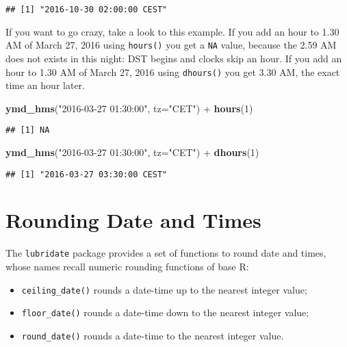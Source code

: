 \documentclass[]{book}
\newenvironment{Shaded}{\begin{snugshade}}{\end{snugshade}}
\newcommand{\KeywordTok}[1]{\textcolor[rgb]{0.13,0.29,0.53}{\textbf{{#1}}}}
\newcommand{\DataTypeTok}[1]{\textcolor[rgb]{0.13,0.29,0.53}{{#1}}}
\newcommand{\DecValTok}[1]{\textcolor[rgb]{0.00,0.00,0.81}{{#1}}}
\newcommand{\StringTok}[1]{\textcolor[rgb]{0.31,0.60,0.02}{{#1}}}
\newcommand{\NormalTok}[1]{{#1}}
\providecommand{\tightlist}{%
  \setlength{\itemsep}{0pt}\setlength{\parskip}{0pt}}
\def\tightlist{}
\begin{document}
\begin{verbatim}
## [1] "2016-10-30 02:00:00 CEST"
\end{verbatim}

If you want to go crazy, take a look to this example. If you add an hour
to 1.30 AM of March 27, 2016 using \texttt{hours()} you get a
\texttt{NA} value, because the 2.59 AM does not exists in this night:
DST begins and clocks skip an hour. If you add an hour to 1.30 AM of
March 27, 2016 using \texttt{dhours()} you get 3.30 AM, the exact time
an hour later.

\begin{Shaded}
\begin{Highlighting}[]
\KeywordTok{ymd_hms}\NormalTok{(}\StringTok{"2016-03-27 01:30:00"}\NormalTok{, }\DataTypeTok{tz=}\StringTok{"CET"}\NormalTok{) +}\StringTok{ }\KeywordTok{hours}\NormalTok{(}\DecValTok{1}\NormalTok{)}
\end{Highlighting}
\end{Shaded}

\begin{verbatim}
## [1] NA
\end{verbatim}

\begin{Shaded}
\begin{Highlighting}[]
\KeywordTok{ymd_hms}\NormalTok{(}\StringTok{"2016-03-27 01:30:00"}\NormalTok{, }\DataTypeTok{tz=}\StringTok{"CET"}\NormalTok{) +}\StringTok{ }\KeywordTok{dhours}\NormalTok{(}\DecValTok{1}\NormalTok{)}
\end{Highlighting}
\end{Shaded}

\begin{verbatim}
## [1] "2016-03-27 03:30:00 CEST"
\end{verbatim}

\section{Rounding Date and Times}\label{rounding-date-and-times}

The \texttt{lubridate} package provides a set of functions to round date
and times, whose names recall numeric rounding functions of base R:

\begin{itemize}
\tightlist
\item
  \texttt{ceiling\_date()} rounds a date-time up to the nearest integer
  value;
\item
  \texttt{floor\_date()} rounds a date-time down to the nearest integer
  value;
\item
  \texttt{round\_date()} rounds a date-time to the nearest integer
  value.
\end{itemize}
\end{document}
